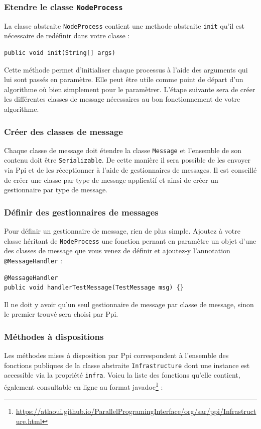 \documentclass{article}
\begin{document}
		\subsubsection{Etendre le classe \lstinline{NodeProcess}}
		La classe abstraite \lstinline{NodeProcess} contient une methode abstraite \lstinline{init}
		qu'il est nécessaire de redéfinir dans votre classe :
		\begin{lstlisting}
public void init(String[] args)
		\end{lstlisting}
		Cette méthode permet d'initialiser chaque processus à l'aide des arguments qui lui sont
		passés en paramètre. Elle peut être utile comme point de départ d'un algorithme où bien
		simplement pour le paramètrer.
		L'étape suivante sera de créer les différentes classes de message nécessaires au bon
		fonctionnement de votre algorithme.

		\subsubsection{Créer des classes de message}
		Chaque classe de message doit étendre la classe \lstinline{Message} et l'ensemble de son
		contenu doit être \lstinline{Serializable}. De cette manière il sera possible de les envoyer
		via Ppi et de les réceptionner à l'aide de gestionnaires de messages. Il est conseillé de
		créer une classe par type de message applicatif et ainsi de créer un gestionnaire par type
		de message.

		\subsubsection{Définir des gestionnaires de messages}
		Pour définir un gestionnaire de message, rien de plus simple. Ajoutez à votre classe
		héritant de \lstinline{NodeProcess} une fonction pernant en paramètre un objet d'une des
		classes de message que vous venez de définir et ajoutez-y l'annotation
		\lstinline{@MessageHandler} :
		\begin{lstlisting}
@MessageHandler
public void handlerTestMessage(TestMessage msg) {}
		\end{lstlisting}

		Il ne doit y avoir qu'un seul gestionnaire de message par classe de message, sinon le
		premier trouvé sera choisi par Ppi.

		\subsubsection{Méthodes à dispositions}
		Les méthodes mises à disposition par Ppi correspondent à l'ensemble des fonctions publiques
		de la classe abstraite \lstinline{Infrastructure} dont une instance est accessible via la
		propriété \lstinline{infra}. Voicu la liste des fonctions qu'elle contient, également
		consultable en ligne au format javadoc\footnote{\href{https://atlaoui.github.io/ParallelProgramingInterface/org/sar/ppi/Infrastructure.html}{https://atlaoui.github.io/ParallelProgramingInterface/org/sar/ppi/Infrastructure.html}} :
\end{document}
